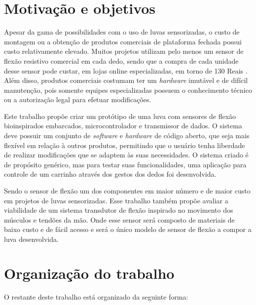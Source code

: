 \documentclass[
	12pt,				%
	openright,			%
	oneside,			%
	a4paper,			%
	english,			%
	brazil				%
	]{abntex2}
\begin{document}

		
		
		
		\section{Motivação e objetivos}

		Apesar da gama de possibilidades com o uso de luvas sensorizadas, o custo de montagem ou a obtenção de produtos comerciais de plataforma fechada possui custo relativamente elevado. Muitos projetos utilizam pelo menos um sensor de flexão resistivo comercial em cada dedo, sendo que a compra de cada unidade desse sensor pode custar, em lojas online especializadas, em torno de 130 Reais \cite{multilogicaflexsensor}. Além disso, produtos comerciais costumam ter um \textit{hardware} imutável e de difícil manutenção, pois somente equipes especializadas possuem o conhecimento técnico ou a autorização legal para efetuar modificações.

		Este trabalho propõe criar um protótipo de uma luva com sensores de flexão bioinspirados embarcados, microcontrolador e transmissor de dados. O sistema deve possuir um conjunto de \textit{software} e \textit{hardware} de código aberto, que seja mais flexível em relação à outros produtos, permitindo que o usuário tenha liberdade de realizar modificações que se adaptem às suas necessidades. O sistema criado é de propósito genérico, mas para testar suas funcionalidades, uma aplicação para controle de um carrinho através dos gestos dos dedos foi desenvolvida.

		Sendo o sensor de flexão um dos componentes em maior número e de maior custo em projetos de luvas sensorizadas. Esse trabalho também propõe avaliar a viabilidade de um sistema transdutor de flexão inspirado no movimento dos músculos e tendões da mão. Onde esse sensor será composto de materiais de baixo custo e de fácil acesso e será o único modelo de sensor de flexão a compor a luva desenvolvida.	
	
		\section{Organização do trabalho}

		O restante deste trabalho está organizado da seguinte forma:
\end{document}
